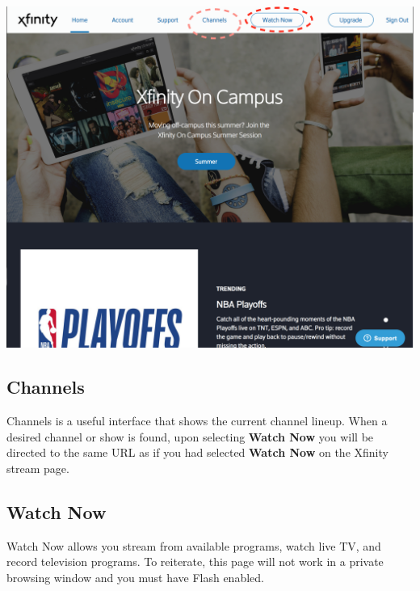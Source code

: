 \documentclass[a4paper, 11pt]{article}
\begin{document}
\includegraphics[width=\linewidth, keepaspectratio]{home.png}
\subsection*{
  Channels 
}

Channels is a useful interface that shows the current channel lineup. 
When a desired channel or show is found, upon selecting \textbf{Watch Now} you
will be directed to the same URL as if you had selected \textbf{Watch Now} on
the Xfinity stream page.

\subsection*{
  Watch Now
}

Watch Now allows you stream from available programs, watch live TV, and record television programs.  To reiterate, this page will not work in a private 
browsing window and you must have Flash enabled.  
\end{document}
